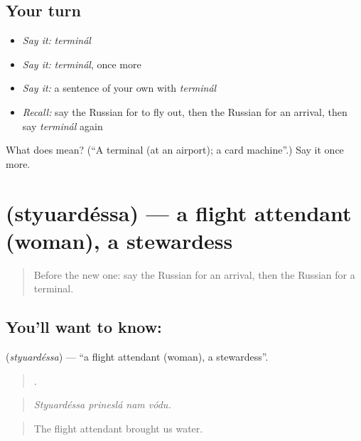 \subsection*{Your turn}
\begin{itemize}
\raggedright
  \item \emph{Say it:} \emph{terminál}
  \item \emph{Say it:} \emph{terminál}, once more
  \item \emph{Say it:} a sentence of your own with \emph{terminál}
  \item \emph{Recall:} say the Russian for to fly out, then the Russian for an arrival, then say \emph{terminál} again
\end{itemize}

\begin{tcolorbox}[breakable,colback=teal!4,colframe=teal!35!black,title={Before you move on}]
What does  mean? (\textquotedblleft{}A terminal (at an airport); a card machine\textquotedblright{}.) Say it once more.
\end{tcolorbox}
\section[\texorpdfstring{\ru{стюардесса} (styuardéssa)}{стюардесса (styuardéssa)}]{ (styuardéssa) — a flight attendant (woman), a stewardess}

\label{lesson:RU-C422-styuardessa}



\begin{quote}
Before the new one: say the Russian for an arrival, then the Russian for a terminal.
\end{quote}

\subsection*{You'll want to know: }
\textbf{} (\emph{styuardéssa}) — \textquotedblleft{}a flight attendant (woman), a stewardess\textquotedblright{}.

\begin{quote}
   .
\end{quote}

\begin{quote}
\emph{Styuardéssa prineslá nam vódu.}
\end{quote}

\begin{quote}
The flight attendant brought us water.
\end{quote}

